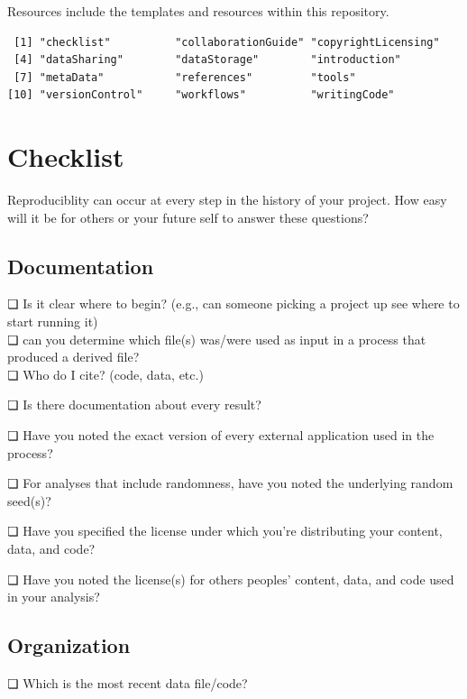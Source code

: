 \documentclass[
]{book}
\theoremstyle{definition}
\theoremstyle{definition}
\theoremstyle{definition}
\theoremstyle{definition}
\theoremstyle{remark}
\begin{document}
Resources include the templates and resources within this repository.

\begin{verbatim}
 [1] "checklist"          "collaborationGuide" "copyrightLicensing"
 [4] "dataSharing"        "dataStorage"        "introduction"      
 [7] "metaData"           "references"         "tools"             
[10] "versionControl"     "workflows"          "writingCode"       
\end{verbatim}

\hypertarget{checklist}{%
\section{Checklist}\label{checklist}}

Reproduciblity can occur at every step in the history of your project. How easy will it be for others or your future self to answer these questions?

\hypertarget{documentation}{%
\subsection{Documentation}\label{documentation}}

❏ Is it clear where to begin? (e.g., can someone picking a project up see where to start running it)\\
❏ can you determine which file(s) was/were used as input in a process that produced a derived file?\\
❏ Who do I cite? (code, data, etc.)

❏ Is there documentation about every result?

❏ Have you noted the exact version of every external application used in the process?

❏ For analyses that include randomness, have you noted the underlying random seed(s)?

❏ Have you specified the license under which you're distributing your content, data, and code?

❏ Have you noted the license(s) for others peoples' content, data, and code used in your analysis?

\hypertarget{organization}{%
\subsection{Organization}\label{organization}}

❏ Which is the most recent data file/code?
\end{document}
